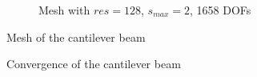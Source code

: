 \begin{figure}[!ht]
\begin{subfigure}[b]{1\linewidth}
            \centering
            \caption{Mesh with $res=128$, $s_{max}=2$, 1658 DOFs}
        \end{subfigure}
        \caption[Mesh of the cantilever beam]{Mesh of the cantilever beam}
        \label{qdt_fig:ex_cantilever_mesh_all}
    \end{figure}


    \begin{figure}[!ht]
        \centering
        \caption[Convergence of the cantilever beam]{Convergence of the cantilever beam}
        \label{qdt_fig:ex_cantilever_mesh_conv}
    \end{figure}
\pagebreak